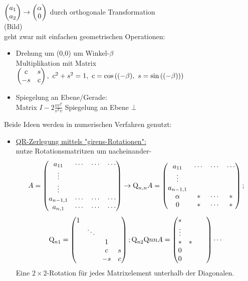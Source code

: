 \documentclass[../Skript.tex]{subfiles}
\begin{document}
\begin{example}[2D]
    \(\begin{pmatrix}a_1\\a_2\end{pmatrix}\to \begin{pmatrix}\alpha\\0\\\end{pmatrix}\) durch orthogonale Transformation\\
    (Bild)\\
    geht zwar mit einfachen geometrischen Operationen:\\
    \begin{itemize}
        \item Drehung um (0,0) um Winkel-\(\beta\)\\
            Multiplikation mit Matrix \(\matrx{c & s\\-s & c\\},\ c^2+s^2=1,\ 
            c=\cos{(-\beta),\ s=\sin{(-\beta)}}\)
        \item Spiegelung an Ebene/Gerade:\\
            Matrix \(I-2\frac{vv^T}{v^Tv}\) Spiegelung an Ebene \(\bot\)\checked
    \end{itemize}
    Beide Ideen werden in numerischen Verfahren genutzt:
    \begin{itemize}
        \item \underline{QR-Zerlegung mittels "girens-Rotationen":}\\
        nutze Rotationsmatritzen um nacheinander-
        \[A=\begin{pmatrix}a_{11} & \cdots & \cdots & \cdots\\
        \vdots & & & \\ \vdots & & & \\a_{n-1,1} & \cdots & \cdots & \cdots\\
        a_{n,1} & \cdots & \cdots & \cdots\end{pmatrix}\to \text{Q}_{n,n}A=
        \begin{pmatrix}a_{11} & \cdots & \cdots & \cdots\\
        \vdots & & & \\ a_{n-1,1} & & & \\ \alpha & * & \cdots & *\\
        0 & * & \cdots & *\end{pmatrix};\]
        \[\text{Q}_{n1}=\begin{pmatrix}1 \\& \ddots &\\&& 1\\ &&c & s\\&&-s & c\\\end{pmatrix};
        \text{Q}_{n2}\text{Q}{nn}A=\begin{pmatrix}*\\\vdots\\ * & *&&\\0\\0\\\end{pmatrix}\cdots\]
        Eine \(2\times 2\)-Rotation für jedes Matrixelement unterhalb der Diagonalen.


\end{itemize}
\end{example}
\end{document}
